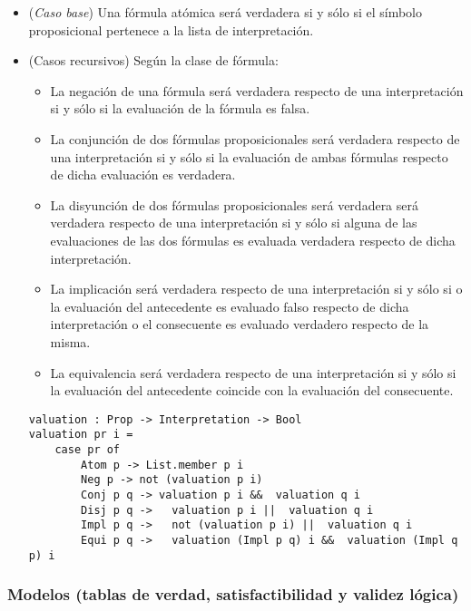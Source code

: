 \documentclass[a4paper]{report}
\begin{document}
\begin{itemize}
\item (\textit{Caso base}) Una fórmula atómica será verdadera si y sólo si el símbolo proposicional pertenece a la lista de interpretación.

\item (Casos recursivos) Según la clase de fórmula:
\begin{itemize}
\item La negación de una fórmula será verdadera respecto de una interpretación si y sólo si la evaluación de la fórmula es falsa.
\item La conjunción de dos fórmulas proposicionales será verdadera respecto de una interpretación si y sólo si la evaluación de ambas fórmulas respecto de dicha evaluación es verdadera.
\item La disyunción de dos fórmulas proposicionales será verdadera será verdadera respecto de una interpretación si y sólo si alguna de las evaluaciones de las dos fórmulas es evaluada verdadera respecto de dicha interpretación.
\item La implicación será verdadera respecto de una interpretación si y sólo si o la evaluación del antecedente es evaluado falso respecto de dicha interpretación o el consecuente es evaluado verdadero respecto de la misma.
\item La equivalencia será verdadera respecto de una interpretación si y sólo si la evaluación del antecedente coincide con la evaluación del consecuente.\\
\end{itemize} 

\begin{lstlisting}[caption= Función de evaluación de las fórmulas proposicionales]
valuation : Prop -> Interpretation -> Bool
valuation pr i =
    case pr of
        Atom p -> List.member p i
        Neg p -> not (valuation p i)
        Conj p q -> valuation p i &&  valuation q i
        Disj p q ->   valuation p i ||  valuation q i
        Impl p q ->   not (valuation p i) ||  valuation q i
        Equi p q ->   valuation (Impl p q) i &&  valuation (Impl q p) i
\end{lstlisting}
\end{itemize}

\subsubsection{Modelos (tablas de verdad, satisfactibilidad y validez lógica)}
\end{document}
